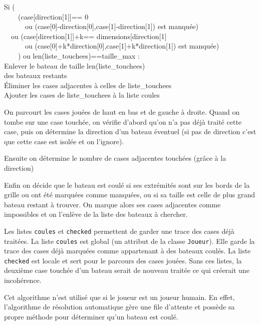 \begin{algo1}
Si (\\
\ \ \ \ (case[direction[1]]== 0 \\
\ \ \ \ \ \ ou (case[0]-direction[0],case[1]-direction[1]) est manquée)\\
\ \ ou (case[direction[1]]+k== dimensions[direction[1] \\
\ \ \ \ \ \ ou (case[0]+k*direction[0],case[1]+k*direction[1]) est manquée)\\
\ \ \ \ ) ou len(liste\_touchees)==taille\_max :\\
Enlever le bateau de taille len(liste\_touchees)\\
des bateaux restants\\
Éliminer les cases adjacentes à celles de liste\_touchees\\
Ajouter les cases de liste\_touchees à la liste coules\\
\end{algo1}

On parcourt les cases jouées de haut en bas et de gauche à droite. Quand on tombe sur une case touchée, on vérifie d'abord qu'on n'a pas déjà traité cette case, puis on détermine la direction d'un bateau éventuel (si pas de direction c'est que cette case est isolée et on l'ignore). 

Ensuite on détermine le nombre de cases adjacentes touchées (grâce à la direction)

Enfin on décide que le bateau est coulé si ses extrémités sont sur les bords de la grille ou ont été marquées comme manquées, ou si sa taille est celle de plus grand bateau restant à trouver. On marque alors ses cases adjacentes comme impossibles et on l'enlève de la liste des bateaux à chercher.

Les listes \texttt{coules} et \texttt{checked} permettent de garder une trace des cases déjà traitées. La liste \texttt{coules} est global (un attribut de la classe \texttt{Joueur}). Elle garde la trace des cases déjà marquées comme appartenant à des bateaux coulés. La liste \texttt{checked} est locale et sert pour le parcours des cases jouées. Sans ces listes, la deuxième case touchée d'un bateau serait de nouveau traitée ce qui créerait une incohérence.

\medskip

Cet algorithme n'est utilisé que si le joueur est un joueur humain. En effet, l'algorithme de résolution automatique gère une file d'attente et possède sa propre méthode pour déterminer qu'un bateau est coulé. 



